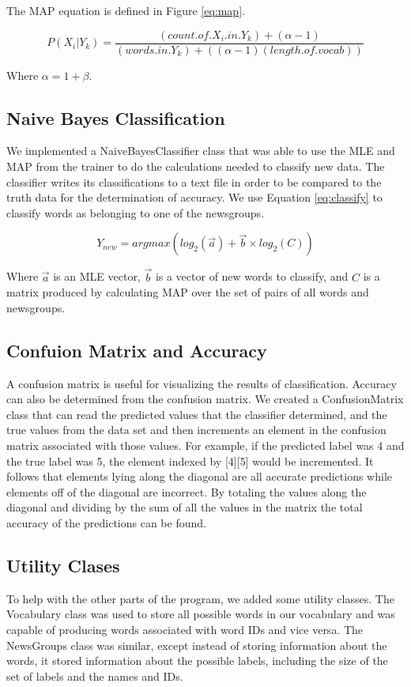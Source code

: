 \documentclass{IEEEtran}
\begin{document}
The MAP equation is defined in Figure \ref{eq:map}.

\begin{equation}
\label{eq:map}
P(X_i|Y_k) = \dfrac{(count.of. X_i .in. Y_k) + (\alpha-1)}{(words.in. Y_k) + ((\alpha-1)(length.of.vocab))}
\end{equation}

Where $\alpha=1+\beta$.

\subsection{Naive Bayes Classification}
We implemented a NaiveBayesClassifier class that was able to use the MLE and MAP from the trainer to do the calculations needed to classify new data. The classifier writes its classifications to a text file in order to be compared to the truth data for the determination of accuracy. We use Equation \ref{eq:classify} to classify words as belonging to one of the newsgroups.

\begin{equation}
\label{eq:classify}
Y_{new} = argmax(log_2(\overrightarrow{a}) + \overrightarrow{b} \times log_2(C))
\end{equation}

Where $\overrightarrow{a}$ is an MLE vector, $\overrightarrow{b}$ is a vector of new words to classify, and $C$ is a matrix produced by calculating MAP over the set of pairs of all words and newsgroups.


\subsection{Confuion Matrix and Accuracy}
A confusion matrix is useful for visualizing the results of classification. Accuracy can also be determined from the confusion matrix. We created a ConfusionMatrix class that can read the predicted values that the classifier determined, and the true values from the data set and then increments an element in the confusion matrix associated with those values. For example, if the predicted label was 4 and the true label was 5, the element indexed by [4][5] would be incremented. It follows that elements lying along the diagonal are all accurate predictions while elements off of the diagonal are incorrect. By totaling the values along the diagonal and dividing by the sum of all the values in the matrix the total accuracy of the predictions can be found. 

\subsection{Utility Clases}
To help with the other parts of the program, we added some utility classes. The Vocabulary class was used to store all possible words in our vocabulary and was capable of producing words associated with word IDs and vice versa. The NewsGroups class was similar, except instead of storing information about the words, it stored information about the possible labels, including the size of the set of labels and the names and IDs.
\end{document}
